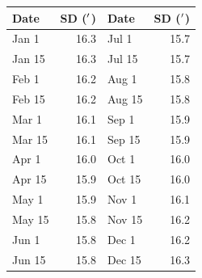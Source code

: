 \begin{tabular}{l r || l r}
\toprule
\textbf{Date} & \textbf{SD (${}^{\prime}$)} & \textbf{Date} & \textbf{SD (${}^{\prime}$)}\\
\midrule
Jan 1 & 16.3 & Jul 1 & 15.7 \\
Jan 15 & 16.3 & Jul 15 & 15.7 \\
Feb 1 & 16.2 & Aug 1 & 15.8 \\
Feb 15 & 16.2 & Aug 15 & 15.8 \\
Mar 1 & 16.1 & Sep 1 & 15.9 \\
Mar 15 & 16.1 & Sep 15 & 15.9 \\
Apr 1 & 16.0 & Oct 1 & 16.0 \\
Apr 15 & 15.9 & Oct 15 & 16.0 \\
May 1 & 15.9 & Nov 1 & 16.1 \\
May 15 & 15.8 & Nov 15 & 16.2 \\
Jun 1 & 15.8 & Dec 1 & 16.2 \\
Jun 15 & 15.8 & Dec 15 & 16.3 \\
\bottomrule
\end{tabular}
